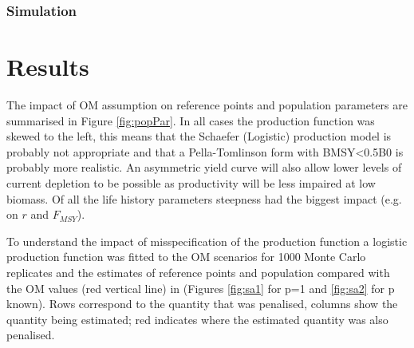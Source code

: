 \documentclass[%
nonumbib,      %
%
]{nrc1}                          %
\begin{document}
\subsubsection*{Simulation}





\section*{Results}

The impact of OM assumption on reference points and population parameters are summarised in Figure \ref{fig:popPar}. In all cases the production function was skewed to the left, this means that the Schaefer (Logistic) production model is probably not appropriate and that a Pella-Tomlinson form with BMSY<0.5B0 is probably more realistic. An asymmetric yield curve will also allow lower levels of current depletion to be possible as productivity will be less impaired at low biomass. Of all the life history parameters steepness had the biggest impact (e.g. on $r$ and $F_{MSY}$). 

To understand the impact of misspecification of the production function a logistic production function was fitted to the OM scenarios for 1000 Monte Carlo replicates and the estimates of reference points and population compared with the OM values (red vertical line) in (Figures \ref{fig:sa1} for p=1 and \ref{fig:sa2} for p known). Rows correspond to the quantity that was penalised, columns show the quantity being estimated; red indicates where the estimated quantity was also penalised. 
\end{document}
